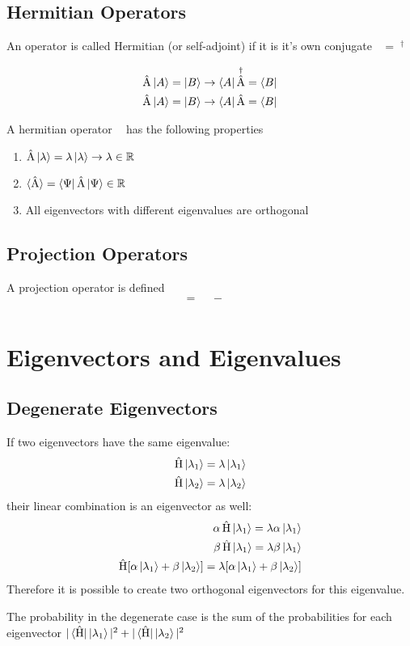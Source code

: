 \documentclass[10pt,a4paper]{book}
\DeclareMathOperator {\opH} {\hat{H}}
\DeclareMathOperator {\opA} {\hat{A}}
\DeclareMathOperator {\opB} {\hat{B}}
\begin{document}
    \section{Hermitian Operators}
    An operator is called Hermitian (or self-adjoint) if it is it's own conjugate $\opA = \opA^\dagger$

\begin{align}
	\opA\ket{A} = \ket{B} \rightarrow \bra{A}\opA^\dagger = \bra{B} \\
	\opA\ket{A} = \ket{B} \rightarrow \bra{A}\opA = \bra{B}         \\
\end{align}

A hermitian operator $\opA$ has the following properties
\begin{enumerate}
	\item $\opA\ket{\lambda} = \lambda \ket{\lambda} \rightarrow \lambda \in \mathbb{R}$
	\item $\braket{\opA} = \bra{\Psi}\opA\ket{\Psi} \in \mathbb{R}$
	\item All eigenvectors with different eigenvalues are orthogonal
\end{enumerate}

\section{Projection Operators}
A projection operator is defined
\begin{align}
	[\opA, \opB] = \opA\opB - \opB\opA \\
\end{align}
\chapter{Eigenvectors and Eigenvalues}
\section{Degenerate Eigenvectors}
If two eigenvectors have the same eigenvalue:
\begin{align}
	\opH\ket{\lambda_1} = \lambda \ket{\lambda_1} \\
	\opH\ket{\lambda_2} = \lambda \ket{\lambda_2}
\end{align}
their linear combination is an eigenvector as well:
\begin{align}
	\alpha \opH\ket{\lambda_1} = \lambda \alpha \ket{\lambda_1} \\
	\beta \opH\ket{\lambda_1} = \lambda \beta \ket{\lambda_1}   \\
	\opH[\alpha \ket{\lambda_1} + \beta \ket{\lambda_2}] = \lambda [\alpha \ket{\lambda_1} + \beta \ket{\lambda_2}]
\end{align}
Therefore it is possible to create two orthogonal eigenvectors for this eigenvalue.

The probability in the degenerate case is the sum of the probabilities for each eigenvector $| \bra{\opH} \ket{\lambda_1}|^2 + | \bra{\opH} \ket{\lambda_2}|^2$
\end{document}
